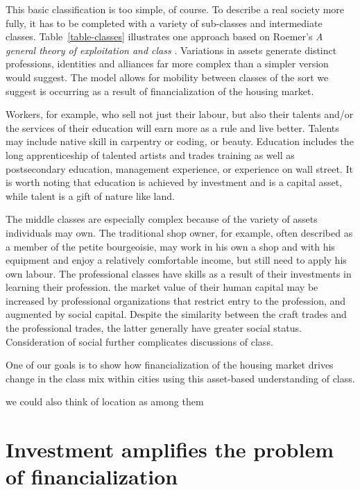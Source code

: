 This basic classification is too simple, of course. To describe a real society more fully, it has to be completed with a variety of sub-classes and intermediate classes. Table~\ref{table-classes} illustrates one approach based on Roemer's  \textit{A general theory of exploitation and class} \cite{roemerGeneralTheoryExploitation1982}. Variations in assets generate distinct professions, identities and alliances far more complex than a simpler version would suggest. The model allows for mobility between classes of the sort we suggest is occurring as a result of financialization of the housing market.

Workers, for example, who sell not just their labour, but also their talents and/or the services of their education will earn more as a rule and live better. Talents may include native skill in carpentry or coding, or beauty. Education includes the long apprenticeship of talented artists and  trades training as well as postsecondary education, management experience, or experience on wall street. It is worth noting that education is achieved by investment and is a capital asset, while talent is a gift of nature like land. 

The middle classes are especially complex because of the variety of assets individuals may own. The traditional shop owner, for example, often described as a member of the \gls{petite bourgeoisie}, may work in his own a shop and with his equipment and enjoy a relatively comfortable income, but still  need to apply his own labour. The professional classes have skills as a result of their investments in learning their profession. the market value of their human capital may be increased by professional organizations that restrict entry to the profession, and augmented by social capital.  Despite the similarity between the craft trades and the professional trades, the latter generally have greater social status. Consideration of social  further complicates discussions of class.

One of our goals is  to show how financialization of the housing market drives change in the class mix within cities using this asset-based understanding of class.





we could also think of location as among them





\section{Investment amplifies the problem of financialization}
